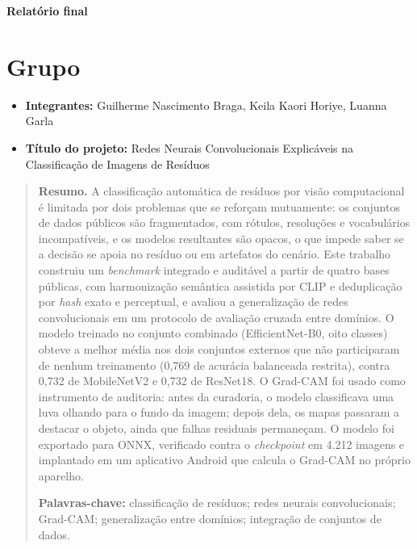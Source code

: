 \documentclass[11pt,a4paper]{article}
\begin{document}
	
	\begin{center}
		{\Large\bfseries Relatório final}
	\end{center}
	\vspace{1em}
	
	\section*{Grupo}
	\begin{itemize}
		\item \textbf{Integrantes:} Guilherme Nascimento Braga, Keila Kaori Horiye, Luanna Garla
		\item \textbf{Título do projeto:} Redes Neurais Convolucionais Explicáveis na Classificação de Imagens de Resíduos
	\end{itemize}
	
	\begin{quote}
		\small
		\textbf{Resumo.} A classificação automática de resíduos por visão computacional é limitada por dois problemas que se reforçam mutuamente: os conjuntos de dados públicos são fragmentados, com rótulos, resoluções e vocabulários incompatíveis, e os modelos resultantes são opacos, o que impede saber se a decisão se apoia no resíduo ou em artefatos do cenário. Este trabalho construiu um \textit{benchmark} integrado e auditável a partir de quatro bases públicas, com harmonização semântica assistida por CLIP e deduplicação por \textit{hash} exato e perceptual, e avaliou a generalização de redes convolucionais em um protocolo de avaliação cruzada entre domínios. O modelo treinado no conjunto combinado (EfficientNet-B0, oito classes) obteve a melhor média nos dois conjuntos externos que não participaram de nenhum treinamento (0,769 de acurácia balanceada restrita), contra 0,732 de MobileNetV2 e 0,732 de ResNet18. O Grad-CAM foi usado como instrumento de auditoria: antes da curadoria, o modelo classificava uma luva olhando para o fundo da imagem; depois dela, os mapas passaram a destacar o objeto, ainda que falhas residuais permaneçam. O modelo foi exportado para ONNX, verificado contra o \textit{checkpoint} em 4.212 imagens e implantado em um aplicativo Android que calcula o Grad-CAM no próprio aparelho.
		
		\smallskip
		\noindent\textbf{Palavras-chave:} classificação de resíduos; redes neurais convolucionais; Grad-CAM; generalização entre domínios; integração de conjuntos de dados.
	\end{quote}
	
\end{document}
